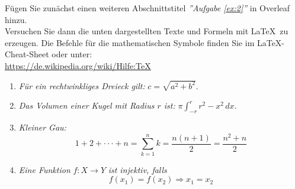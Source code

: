 \begin{ex} \label{ex:2}
Fügen Sie zunächst einen weiteren Abschnittstitel \emph{''Aufgabe \ref{ex:2}''}  in Overleaf hinzu.\\
Versuchen Sie dann die unten dargestellten Texte und Formeln mit \LaTeX\ zu erzeugen.
Die Befehle für die mathematischen Symbole finden Sie im \LaTeX -Cheat-Sheet oder unter:\\
 \url{https://de.wikipedia.org/wiki/Hilfe:TeX}
\begin{enumerate}
	\item \emph{Für ein rechtwinkliges Dreieck gilt:} $c = \sqrt{a^2+b^2}$.
	\item \emph{Das Volumen einer Kugel mit Radius $r$ ist:} $\pi\int_{-r}^{r}r^2-x^2 \,dx$.
	\item \emph{Kleiner Gau:} \[ 1+2+\cdot \cdot \cdot +n = \sum_{k=1}^{n}k=\frac{n(n+1)}{2}=\frac{n^2+n}{2} \]
	\item \emph{Eine Funktion} $f:X \rightarrow Y$ \emph{ist injektiv, falls}
		\begin{equation}
			f(x_1)=f(x_2) \Rightarrow x_1=x_2
		\end{equation}
\end{enumerate}
\end{ex}